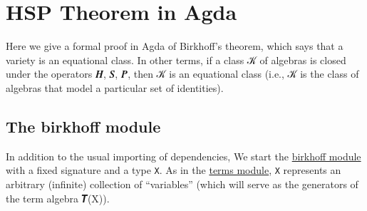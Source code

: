 \documentclass[sigplan,screen]{acmart}
\newcommand\termsmodule{\href{https://gitlab.com/ualib/ualib.gitlab.io/-/blob/master/terms.lagda.rst}{terms module}\xspace}
\newcommand\closuremodule{\href{https://gitlab.com/ualib/ualib.gitlab.io/-/blob/master/congruences.lagda.rst}{closure module}\xspace}
\newcommand\birkhoffmodule{\href{https://gitlab.com/ualib/ualib.gitlab.io/-/blob/master/birkhoff.lagda.rst}{birkhoff module}\xspace}
\newcommand\termsmodule{\href{anonymizedLink/terms.lagda.rst}{terms module}\xspace}
\newcommand\closuremodule{\href{anonymizedLink/congruences.lagda.rst}{closure module}\xspace}
\newcommand\birkhoffmodule{\href{anonymizedLink/birkhoff.lagda.rst}{birkhoff module}\xspace}
\begin{document}
\begin{comment}
\subsubsection{Identities for HSP closure}\label{identities-for-hsp-closure}
\begin{code}\end{code}


\subsection{Axiomatization of a class}\label{axiomatization-of-a-class}
We conclude the \closuremodule by proving that a class 𝒦 of structures is axiomatized by \texttt{Th\ (VClo\ 𝒦)}, which is the set of equations satisfied by all members of the varietal closure of 𝒦.
\begin{code}\end{code}

\end{comment}


\section{HSP Theorem in Agda}\label{hsp-theorem-in-agda}
Here we give a formal proof in Agda of Birkhoff's theorem, which says that a variety is an equational class. In other terms, if a class 𝒦 of algebras is closed under the operators 𝑯, 𝑺, 𝑷, then 𝒦 is an equational class (i.e., 𝒦 is the class of algebras that model a particular set of identities).

\subsection{The birkhoff module}\label{the-birkhoff-module}
In addition to the usual importing of dependencies, We start the \birkhoffmodule with a fixed signature and a type \texttt{X}. As in the \termsmodule, \texttt{X} represents an arbitrary (infinite) collection of ``variables'' (which will serve as the generators of the term algebra 𝑻(X)).
\begin{code}\end{code}
\end{document}
